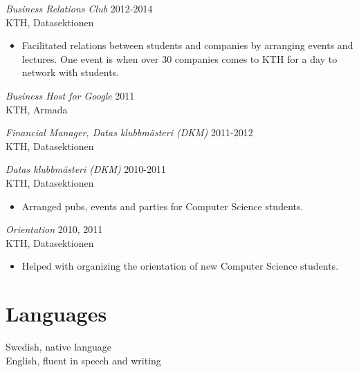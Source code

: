 \documentclass[margin, 10pt]{res} %
\begin{document}
\begin{resume}
{\sl Business Relations Club} \hfill 2012-2014 \\
KTH, Datasektionen
\begin{itemize} 
\item Facilitated relations between students and companies by arranging events and lectures. One event is when over 30 companies comes to KTH for a day to network with students.
\end{itemize}

{\sl Business Host for Google} \hfill 2011 \\
KTH, Armada

{\sl Financial Manager, Datas klubbmästeri (DKM)} \hfill 2011-2012 \\
KTH, Datasektionen

{\sl Datas klubbmästeri (DKM)} \hfill 2010-2011 \\
KTH, Datasektionen
\begin{itemize} 
\item Arranged pubs, events and parties for Computer Science students.
\end{itemize}

{\sl Orientation} \hfill 2010, 2011 \\
KTH, Datasektionen
\begin{itemize} 
\item Helped with organizing the orientation of new Computer Science students.
\end{itemize}


\section{Languages}
Swedish, native language \\
English, fluent in speech and writing


\end{resume}
\end{document}
